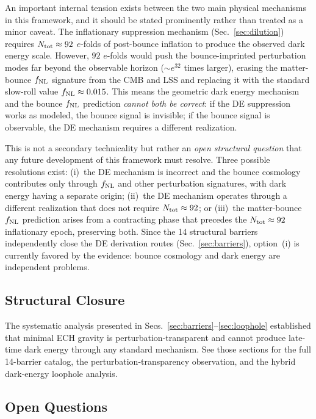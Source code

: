 \documentclass[aps,prd,twocolumn,superscriptaddress,showpacs,preprintnumbers,nofootinbib,longbibliography,floatfix]{revtex4-2}
\newcommand{\fnl}{f_{\rm NL}}
\begin{document}
An important internal tension exists between the two main physical mechanisms in this framework, and it should be stated prominently rather than treated as a minor caveat. The inflationary suppression mechanism (Sec.~\ref{sec:dilution}) requires $N_{\rm tot} \approx 92$ $e$-folds of post-bounce inflation to produce the observed dark energy scale. However, $92$ $e$-folds would push the bounce-imprinted perturbation modes far beyond the observable horizon (${\sim}e^{32}$ times larger), erasing the matter-bounce $\fnl$ signature from the CMB and LSS and replacing it with the standard slow-roll value $\fnl \approx 0.015$. This means the geometric dark energy mechanism and the bounce $\fnl$ prediction \emph{cannot both be correct}: if the DE suppression works as modeled, the bounce signal is invisible; if the bounce signal is observable, the DE mechanism requires a different realization.

This is not a secondary technicality but rather an \emph{open structural question} that any future development of this framework must resolve. Three possible resolutions exist: (i)~the DE mechanism is incorrect and the bounce cosmology contributes only through $\fnl$ and other perturbation signatures, with dark energy having a separate origin; (ii)~the DE mechanism operates through a different realization that does not require $N_{\rm tot} \approx 92$; or (iii)~the matter-bounce $\fnl$ prediction arises from a contracting phase that precedes the $N_{\rm tot} \approx 92$ inflationary epoch, preserving both. Since the 14 structural barriers independently close the DE derivation routes (Sec.~\ref{sec:barriers}), option~(i) is currently favored by the evidence: bounce cosmology and dark energy are independent problems.

\subsection{Structural Closure}\label{sec:ech_closure}

The systematic analysis presented in Secs.~\ref{sec:barriers}--\ref{sec:loophole} established that minimal ECH gravity is perturbation-transparent and cannot produce late-time dark energy through any standard mechanism. See those sections for the full 14-barrier catalog, the perturbation-transparency observation, and the hybrid dark-energy loophole analysis.

\subsection{Open Questions}
\end{document}
